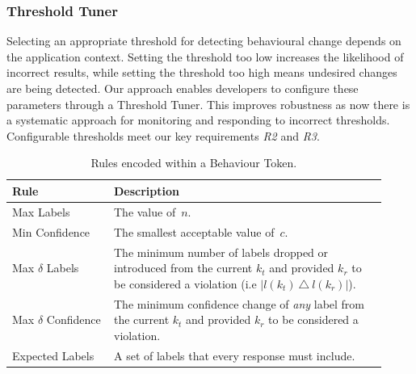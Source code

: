 \subsubsection{Threshold Tuner} Selecting an appropriate threshold for detecting behavioural change depends on the application context. Setting the threshold too low increases the likelihood of incorrect results, while setting the threshold too high means undesired changes are being detected. Our approach enables developers to configure these parameters through a Threshold Tuner.  This improves robustness as now there is a systematic approach for monitoring and responding to incorrect thresholds. Configurable thresholds meet our key requirements \textit{R2} and \textit{R3}.  

\begin{table}[t]
    \centering
    \caption[Rules encoded within behaviour tokens]{Rules encoded within a Behaviour Token.}
    \label{tab:behaviour-token-rules}
    \small
    \begin{tabular}{p{0.25\linewidth}|p{0.675\linewidth}}
    \toprule
    \textbf{Rule} &
    \textbf{Description}\\
    \midrule
    Max Labels & The value of~$n$.\\
    Min Confidence & The smallest acceptable value of~$c$.\\
    Max $\delta$ Labels & The minimum number of labels dropped or introduced from the current $k_{t}$ and provided $k_{r}$ to be considered a violation (i.e $|l(k_{t})~\triangle~l(k_{r})|$).\\
    Max $\delta$ Confidence & The minimum confidence change of \textit{any} label from the current $k_{t}$ and provided $k_{r}$ to be considered a violation.\\
    Expected Labels & A set of labels that every response must include.\\
    \bottomrule
    \end{tabular}
\end{table}

